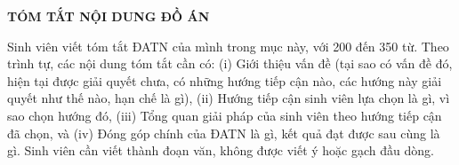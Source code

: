 \documentclass[../DoAn.tex]{subfiles}
\begin{document}
\begin{center}
    \Large{\textbf{TÓM TẮT NỘI DUNG ĐỒ ÁN}}\\
\end{center}
\vspace{1cm}
Sinh viên viết tóm tắt ĐATN của mình trong mục này, với 200 đến 350 từ. Theo trình tự, các nội dung tóm tắt cần có: (i) Giới thiệu vấn đề (tại sao có vấn đề đó, hiện tại được giải quyết chưa, có những hướng tiếp cận nào, các hướng này giải quyết như thế nào, hạn chế là gì), (ii) Hướng tiếp cận sinh viên lựa chọn là gì, vì sao chọn hướng đó, (iii) Tổng quan giải pháp của sinh viên theo hướng tiếp cận đã chọn, và (iv) Đóng góp chính của ĐATN là gì, kết quả đạt được sau cùng là gì. Sinh viên cần viết thành đoạn văn, không được viết ý hoặc gạch đầu dòng.
\end{document}
